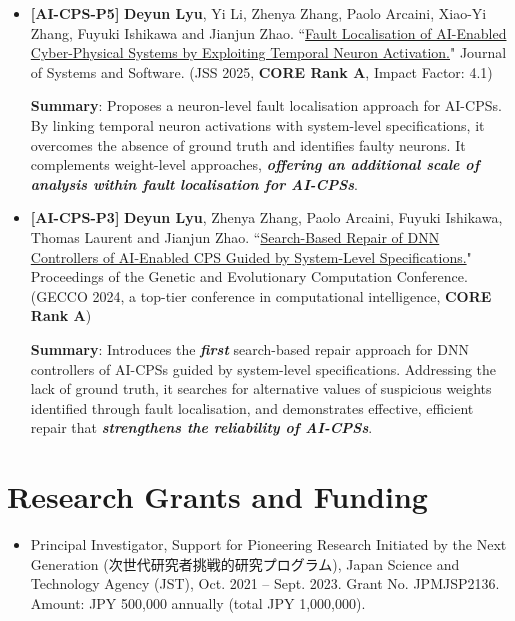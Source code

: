 \documentclass[11pt,a4paper]{moderncv}        %
\newcommand{\highlight}[1]{\textcolor{deepPurple}{\textbf{#1}}}
\newcommand{\strongit}[1]{\textbf{\textit{#1}}}
\begin{document}
\begin{itemize}
    \textbf{Summary}: Introduces the \strongit{first} fault localisation approach for AI-CPSs. Addressing the lack of per-inference ground truth in sequential control decisions, it exploits temporal sequences of DNN inferences with suspiciousness metrics to \strongit{identify faulty weights}. Evaluated on \strongit{6,067} faulty benchmarks, it effectively localises faults, \strongit{enabling subsequent analysis and repair of AI-CPSs}.
    \item \textbf{[AI-CPS-P5]} \textbf{Deyun Lyu}, Yi Li, Zhenya Zhang, Paolo Arcaini, Xiao-Yi Zhang, Fuyuki Ishikawa and Jianjun Zhao. ``\href{https://www.sciencedirect.com/science/article/abs/pii/S0164121225001438}{Fault Localisation of AI-Enabled Cyber-Physical Systems by Exploiting Temporal Neuron Activation.}" Journal of Systems and Software. (JSS 2025, \highlight{CORE Rank A}, Impact Factor: 4.1) 

    \textbf{Summary}: Proposes a neuron-level fault localisation approach for AI-CPSs. By linking temporal neuron activations with system-level specifications, it overcomes the absence of ground truth and identifies faulty neurons. It complements weight-level approaches, \strongit{offering an additional scale of analysis within fault localisation for AI-CPSs}.
    \item \textbf{[AI-CPS-P3]} \textbf{Deyun Lyu}, Zhenya Zhang, Paolo Arcaini, Fuyuki Ishikawa, Thomas Laurent and Jianjun Zhao. ``\href{https://dl.acm.org/doi/10.1145/3638529.3654078}{Search-Based Repair of DNN Controllers of AI-Enabled CPS Guided by System-Level Specifications.}"  Proceedings of the Genetic and Evolutionary Computation Conference. (GECCO 2024, a top-tier conference in computational intelligence, \highlight{CORE Rank A})

    \textbf{Summary}: Introduces the \strongit{first} search-based repair approach for DNN controllers of AI-CPSs guided by system-level specifications. Addressing the lack of ground truth, it searches for alternative values of suspicious weights identified through fault localisation, and demonstrates effective, efficient repair that \strongit{strengthens the reliability of AI-CPSs}.
\end{itemize}

\section{Research Grants and Funding}

\begin{itemize}
    \item Principal Investigator, Support for Pioneering Research Initiated by the Next Generation (次世代研究者挑戦的研究プログラム), Japan Science and Technology Agency (JST), Oct. 2021 -- Sept. 2023. Grant No. JPMJSP2136. Amount: JPY 500,000 annually (total JPY 1,000,000).
\end{itemize}
\end{document}
